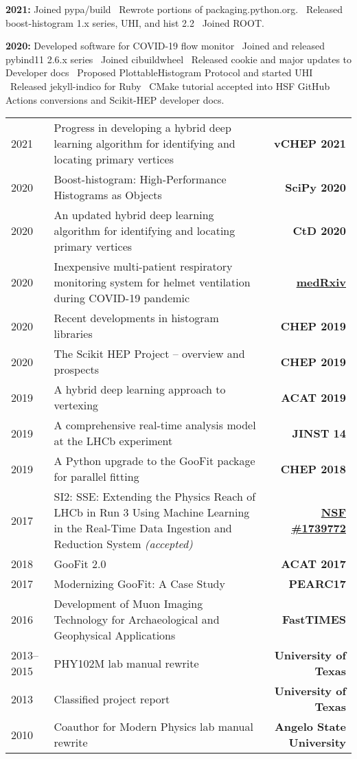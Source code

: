 \documentclass[10pt,letterpaper,english]{moderncv}
\begin{document}

\textbf{2021:} Joined pypa/build \bullet\ Rewrote portions of packaging.python.org. \bullet\ Released boost-histogram 1.x series, UHI, and hist 2.2 \bullet\ Joined ROOT.

\textbf{2020:} Developed software for COVID-19 flow monitor \bullet\ Joined and released pybind11 2.6.x series \bullet\ Joined cibuildwheel \bullet\ Released cookie and major updates to Developer docs \bullet\ Proposed PlottableHistogram Protocol and started UHI \bullet\ Released jekyll-indico for Ruby \bullet\ CMake tutorial accepted into HSF \bullet GitHub Actions conversions and Scikit-HEP developer docs.


\begin{tabularx}{\textwidth}{p{.8in}X>{\bfseries}r}
2021 & Progress in developing a hybrid deep learning algorithm for identifying and locating primary vertices & vCHEP 2021 \\
2020 & Boost-histogram: High-Performance Histograms as Objects & SciPy 2020 \\
2020 & An updated hybrid deep learning algorithm for identifying and locating primary vertices & CtD 2020 \\
2020 & Inexpensive multi-patient respiratory monitoring system for helmet ventilation during COVID-19 pandemic & \href{https://doi.org/10.1101/2020.06.29.20141283}{medRxiv} \\
2020 & Recent developments in histogram libraries & CHEP 2019 \\
2020 & The Scikit HEP Project -- overview and prospects & CHEP 2019 \\
2019 & A hybrid deep learning approach to vertexing &  ACAT 2019 \\ 
2019 & A comprehensive real-time analysis model at the LHCb experiment & JINST 14 \\
2019 & A Python upgrade to the GooFit package for parallel fitting & CHEP 2018 \\
2017 & SI2: SSE: Extending the Physics Reach of LHCb in Run 3 Using Machine Learning in the Real-Time Data Ingestion and Reduction System  \textit{(accepted)} & \href{https://nsf.gov/awardsearch/showAward?AWD_ID=1739772}{NSF \#1739772} \\ %
2018 & GooFit 2.0 & ACAT 2017 \\ %
2017 & Modernizing GooFit: A Case Study & PEARC17 \\ 
2016 & Development of Muon Imaging Technology
for Archaeological and Geophysical Applications & FastTIMES \\
2013--2015 & PHY102M lab manual rewrite & University of Texas \\
2013 & Classified project report & University of Texas\\
2010 & Coauthor for Modern Physics lab manual rewrite & Angelo State University\\
\end{tabularx}
\end{document}
